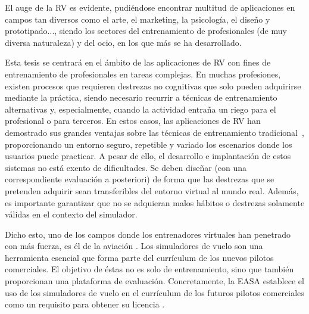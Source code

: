 
El auge de la \ac{RV} es evidente, pudiéndose encontrar multitud de aplicaciones en campos tan diversos como el arte, el marketing, la psicología, el diseño y prototipado..., siendo los sectores del entrenamiento de profesionales (de muy diversa naturaleza) y del ocio, en los que más se ha desarrollado.

Esta tesis se centrará en el ámbito de las aplicaciones de \ac{RV} con fines de entrenamiento de profesionales en tareas complejas. En muchas profesiones, existen procesos que requieren destrezas no cognitivas que solo pueden adquirirse mediante la práctica, siendo necesario recurrir a técnicas de entrenamiento alternativas y, especialmente, cuando la actividad entraña un riego para el profesional o para terceros. En estos casos, las aplicaciones de \ac{RV} han demostrado sus grandes ventajas sobre las técnicas de entrenamiento tradicional~\cite{PATEL2017266.e7}, proporcionando un entorno seguro, repetible y variado los escenarios donde los usuarios puede practicar. A pesar de ello, el desarrollo e implantación de estos sistemas no está exento de dificultades. Se deben diseñar (con una correspondiente evaluación a posteriori) de forma que las destrezas que se pretenden adquirir sean transferibles del entorno virtual al mundo real. Además, es importante garantizar que no se adquieran malos hábitos o destrezas solamente válidas en el contexto del simulador.

Dicho esto, uno de los campos donde los entrenadores virtuales han penetrado con más fuerza, es él de la aviación \cite{lee2017flight}. Los simuladores de vuelo son una herramienta esencial que forma parte del currículum de los nuevos pilotos comerciales\cite{piloto}. El objetivo de éstas no es solo de entrenamiento, sino que también proporcionan una plataforma de evaluación.  %
Concretamente, la \ac{EASA} establece el uso de los simuladores de vuelo en el currículum de los futuros pilotos comerciales como un requisito para obtener su licencia \cite{normativa}.

